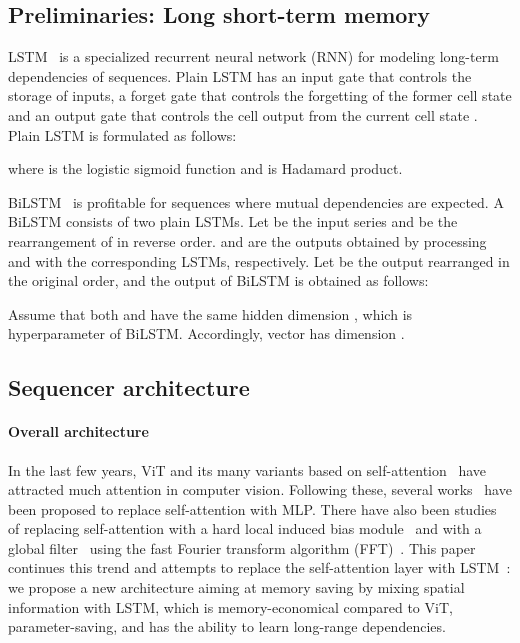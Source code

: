 \documentclass{article}
\begin{document}
\subsection{Preliminaries: Long short-term memory}
\label{subsec:lstm}
LSTM~\cite{hochreiter1997long} is a specialized recurrent neural network (RNN) for modeling long-term dependencies of sequences. Plain LSTM has an input gate  that controls the storage of inputs, a forget gate  that controls the forgetting of the former cell state  and an output gate  that controls the cell output  from the current cell state . Plain LSTM is formulated as follows:

where  is the logistic sigmoid function and  is Hadamard product.

BiLSTM~\cite{schuster1997bidirectional} is profitable for sequences where mutual dependencies are expected. A BiLSTM consists of two plain LSTMs. Let  be the input series and  be the rearrangement of  in reverse order.  and  are the outputs obtained by processing  and  with the corresponding LSTMs, respectively. Let  be the output  rearranged in the original order, and the output of BiLSTM is obtained as follows:

Assume that both  and  have the same hidden dimension , which is hyperparameter of BiLSTM. Accordingly, vector  has dimension .

\subsection{Sequencer architecture}
\label{subsec:sequencer}
\paragraph{Overall architecture}
In the last few years, ViT and its many variants based on self-attention~\cite{dosovitskiy2020image,  touvron2020training, liu2021swin, zhou2021refiner} have attracted much attention in computer vision. Following these, several works~\cite{tolstikhin2021mlp, touvron2021resmlp, liu2021pay, hou2022vision} have been proposed to replace self-attention with MLP. There have also been studies of replacing self-attention with a hard local induced bias module~\cite{chen2022cyclemlp, yu2021metaformer} and with a global filter~\cite{rao2021global} using the fast Fourier transform algorithm (FFT)~\cite{cooley1965algorithm}. This paper continues this trend and attempts to replace the self-attention layer with LSTM~\cite{hochreiter1997long}: we propose a new architecture aiming at memory saving by mixing spatial information with LSTM, which is memory-economical compared to ViT, parameter-saving, and has the ability to learn long-range dependencies.
\end{document}
